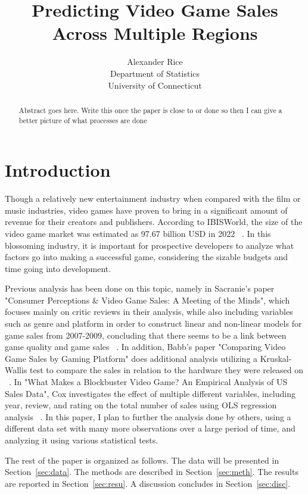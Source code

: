 \documentclass[12pt]{article}
\title{Predicting Video Game Sales Across Multiple Regions}
\author{Alexander Rice\\
  Department of Statistics\\
  University of Connecticut
}
\begin{document}
\maketitle

\begin{abstract}
Abstract goes here. Write this once the paper is close to or done so then I can give a better picture of what processes are done

\end{abstract}


\section{Introduction}
\label{sec:intro}
Though a relatively new entertainment industry when compared with the film or music industries, video games have proven to bring in a 
significant amount of revenue for their creators and publishers. According to IBISWorld, the size of the video game market was estimated 
as 97.67 billion USD in 2022 ~\citep[(A)][]{Marketsizestat}.  In this blossoming industry, it is important for prospective developers 
to analyze what factors go into making a successful game, considering the sizable budgets and time going into development. 

Previous analysis has been done on this topic, namely in Sacranie's paper "Consumer Perceptions \& Video Game Sales: A Meeting of the Minds", 
which focuses mainly on critic reviews in their analysis, while also including variables such as genre and platform in order to construct 
linear and non-linear models for game sales from 2007-2009, concluding that there seems to be a link between game quality and game sales 
~\citep[(B)][]{Sacranie2010Analysis}. In addition, Babb's paper "Comparing Video Game Sales by Gaming Platform" does additional analysis 
utilizing a Kruskal-Wallis test to compare the sales in relation to the hardware they were released on ~\citep[(C)][]{Babb2013Analysis}. 
In "What Makes a Blockbuster Video Game? An Empirical Analysis of US Sales Data", Cox investigates the effect of multiple different variables,
including year, review, and rating on the total number of sales using OLS regression analysis ~\citep[(E)][]{Cox2013Analysis}.
In this paper, I plan to further the analysis done by others, using a different data set with many more observations over a large period 
of time, and analyzing it using various statistical tests.

The rest of the paper is organized as follows.
The data will be presented in Section~\ref{sec:data}.
The methods are described in Section~\ref{sec:meth}.
The results are reported in Section~\ref{sec:resu}.
A discussion concludes in Section~\ref{sec:disc}.
\end{document}
